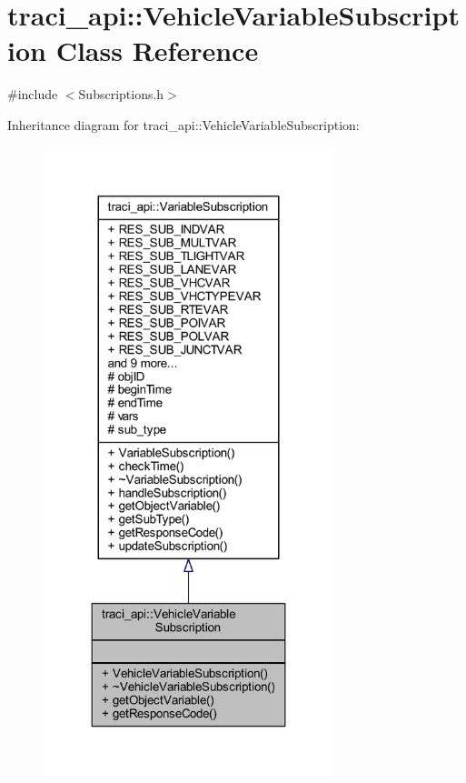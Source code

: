 \hypertarget{classtraci__api_1_1_vehicle_variable_subscription}{}\section{traci\+\_\+api\+:\+:Vehicle\+Variable\+Subscription Class Reference}
\label{classtraci__api_1_1_vehicle_variable_subscription}


{\ttfamily \#include $<$Subscriptions.\+h$>$}



Inheritance diagram for traci\+\_\+api\+:\+:Vehicle\+Variable\+Subscription\+:
\nopagebreak
\begin{figure}[H]
\begin{center}
\leavevmode
\includegraphics[width=239pt]{classtraci__api_1_1_vehicle_variable_subscription__inherit__graph}
\end{center}
\end{figure}


